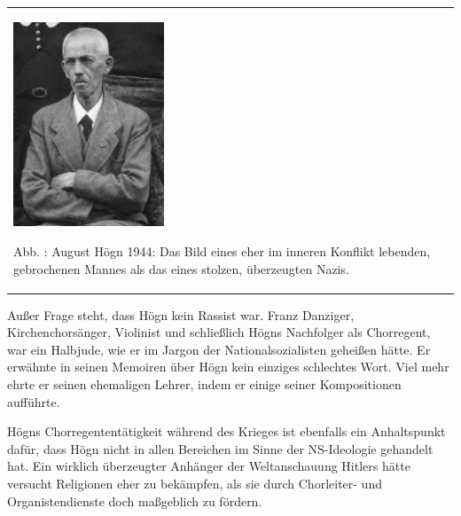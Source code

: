\begin{center}
\begin{minipage}{4.928cm}
\begin{flushleft}
\tablefirsthead{}
\tablehead{}
\tabletail{}
\tablelasttail{}
\begin{supertabular}{m{4.728cm}}

\includegraphics[width=4.503cm,height=6.103cm]{pictures/zulassungsarbeit-img036.jpg}

Abb. : August Högn 1944: Das Bild eines eher
im inneren Konflikt lebenden, gebrochenen Mannes als das eines stolzen,
überzeugten Nazis.\\
\end{supertabular}
\end{flushleft}
\end{minipage}
\end{center}
Außer Frage steht, dass Högn kein Rassist war. Franz Danziger,
Kirchenchorsänger, Violinist und schließlich Högns Nachfolger als
Chorregent, war ein Halbjude, wie er im Jargon der Nationalsozialisten
geheißen hätte. Er erwähnte in seinen Memoiren über Högn kein einziges
schlechtes Wort. Viel mehr ehrte er seinen ehemaligen Lehrer, indem er
einige seiner Kompositionen aufführte.

Högns Chorregententätigkeit während des Krieges ist ebenfalls ein
Anhaltspunkt dafür, dass Högn nicht in allen Bereichen im Sinne der
NS-Ideologie gehandelt hat. Ein wirklich überzeugter Anhänger der
Weltanschauung Hitlers hätte versucht Religionen eher zu bekämpfen, als
sie durch Chorleiter- und Organistendienste doch maßgeblich zu fördern.
